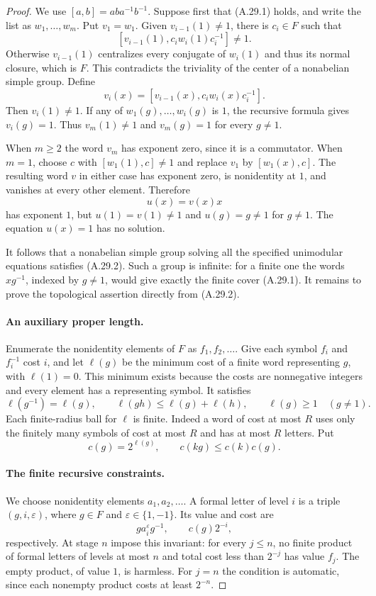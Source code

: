 \begin{proof}
We use $[a,b]=aba^{-1}b^{-1}$. Suppose first that
(A.29.1) holds, and write the list as $w_1,\ldots,w_m$.
Put $v_1=w_1$. Given $v_{i-1}(1)\ne1$, there is
$c_i\in F$ such that
\[
 [v_{i-1}(1),c_iw_i(1)c_i^{-1}]\ne1.
 \tag{A.29.3}
\]
Otherwise $v_{i-1}(1)$ centralizes every conjugate of
$w_i(1)$ and thus its normal closure, which is $F$.
This contradicts the triviality of the center of a
nonabelian simple group. Define
\[
 v_i(x)=[v_{i-1}(x),c_iw_i(x)c_i^{-1}].
 \tag{A.29.4}
\]
Then $v_i(1)\ne1$. If any of
$w_1(g),\ldots,w_i(g)$ is $1$, the recursive formula
gives $v_i(g)=1$. Thus $v_m(1)\ne1$ and
$v_m(g)=1$ for every $g\ne1$.

When $m\geq2$ the word $v_m$ has exponent zero,
since it is a commutator. When $m=1$, choose $c$
with $[w_1(1),c]\ne1$ and replace $v_1$ by
$[w_1(x),c]$. The resulting word $v$ in either case
has exponent zero, is nonidentity at $1$, and
vanishes at every other element. Therefore
\[
 u(x)=v(x)x
 \tag{A.29.5}
\]
has exponent $1$, but $u(1)=v(1)\ne1$ and
$u(g)=g\ne1$ for $g\ne1$. The equation $u(x)=1$
has no solution.

It follows that a nonabelian simple group solving
all the specified unimodular equations satisfies
(A.29.2). Such a group is infinite: for a finite
one the words $xg^{-1}$, indexed by $g\ne1$,
would give exactly the finite cover (A.29.1).
It remains to prove the topological assertion
directly from (A.29.2).

\paragraph{An auxiliary proper length.}
Enumerate the nonidentity elements of $F$ as
$f_1,f_2,\ldots$. Give each symbol $f_i$ and
$f_i^{-1}$ cost $i$, and let $\ell(g)$ be the
minimum cost of a finite word representing $g$,
with $\ell(1)=0$. This minimum exists because
the costs are nonnegative integers and every
element has a representing symbol. It satisfies
\[
 \ell(g^{-1})=\ell(g),\qquad
 \ell(gh)\leq\ell(g)+\ell(h),\qquad
 \ell(g)\geq1\quad(g\ne1).
 \tag{A.29.6}
\]
Each finite-radius ball for $\ell$ is finite.
Indeed a word of cost at most $R$ uses only
the finitely many symbols of cost at most $R$
and has at most $R$ letters. Put
\[
 c(g)=2^{\ell(g)},\qquad c(kg)\leq c(k)c(g).
 \tag{A.29.7}
\]

\paragraph{The finite recursive constraints.}
We choose nonidentity elements $a_1,a_2,\ldots$.
A formal letter of level $i$ is a triple
$(g,i,\varepsilon)$, where $g\in F$ and
$\varepsilon\in\{1,-1\}$. Its value and cost are
\[
 ga_i^{\varepsilon}g^{-1},\qquad
 c(g)2^{-i},
 \tag{A.29.8}
\]
respectively. At stage $n$ impose this invariant:
for every $j\leq n$, no finite product of formal
letters of levels at most $n$ and total cost
less than $2^{-j}$ has value $f_j$.
The empty product, of value $1$, is harmless.
For $j=n$ the condition is automatic, since
each nonempty product costs at least $2^{-n}$.


\end{proof}

